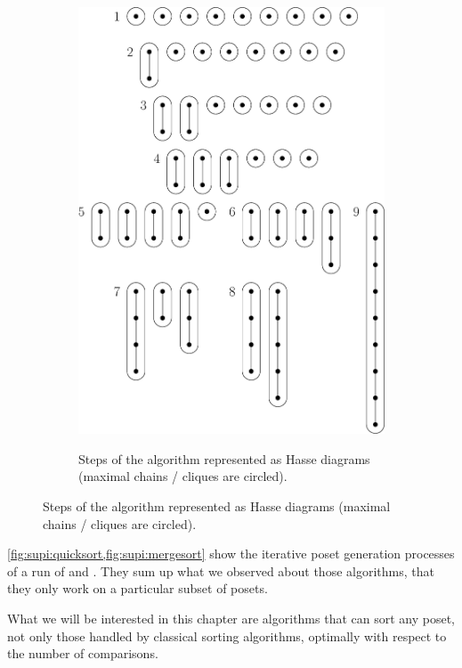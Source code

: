 \begin{figure}
\begin{subfigure}[b]{0.4\textwidth}
{\includegraphics[width=\textwidth]{fig/supi/mergesort}} \caption{Steps of the
\mergesort algorithm represented as Hasse diagrams (maximal chains / cliques are
circled).} \label{fig:supi:mergesort} \end{subfigure} \end{figure}


\cref{fig:supi:quicksort,fig:supi:mergesort} show the iterative poset
generation processes of a run of \quicksort and \mergesort. They sum up what we
observed about those algorithms, that they only work on a particular subset of
posets.

What we will be interested in this chapter are algorithms that can sort any
poset, \ie not only those handled by classical sorting algorithms, optimally
with respect to the number of comparisons.
